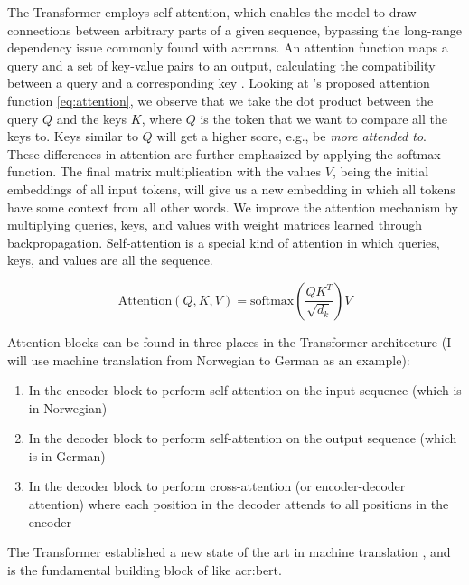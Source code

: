 The Transformer employs self-attention, which enables the model to draw connections between arbitrary parts of a given sequence, bypassing the long-range dependency issue commonly found with \glspl{acr:rnn}. An attention function maps a query and a set of key-value pairs to an output, calculating the compatibility between a query and a corresponding key \citep[3]{vaswaniAttentionAllYou2017a}. Looking at \citeauthor{vaswaniAttentionAllYou2017a}'s proposed attention function \eqref{eq:attention}, we observe that we take the dot product between the query $Q$ and the keys $K$, where $Q$ is the token that we want to compare all the keys to. Keys similar to $Q$ will get a higher score, e.g., be \textit{more attended to}. These differences in attention are further emphasized by applying the softmax function. The final matrix multiplication with the values $V$, being the initial embeddings of all input tokens, will give us a new embedding in which all tokens have some context from all other words. We improve the attention mechanism by multiplying queries, keys, and values with weight matrices learned through backpropagation. Self-attention is a special kind of attention in which queries, keys, and values are all the sequence.

\begin{equation}
    \text{Attention}(Q, K, V) = \text{softmax}\left(\frac{QK^T}{\sqrt{d_k}}\right)V
    \label{eq:attention}
\end{equation}

Attention blocks can be found in three places in the Transformer architecture \citep[5]{vaswaniAttentionAllYou2017a} (I will use machine translation from Norwegian to German as an example):

\begin{enumerate}
    \item In the encoder block to perform self-attention on the input sequence (which is in Norwegian)
    \item In the decoder block to perform self-attention on the output sequence (which is in German)
    \item In the decoder block to perform cross-attention (or encoder-decoder attention) where each position in the decoder attends to all positions in the encoder
\end{enumerate}

The Transformer established a new state of the art in machine translation \cite{vaswaniAttentionAllYou2017a}, and is the fundamental building block of  like \acrshort{acr:bert}.


